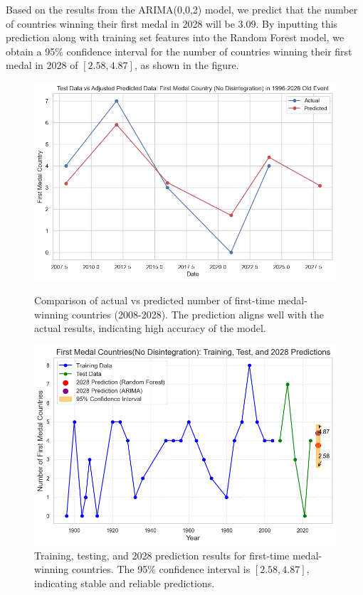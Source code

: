 \documentclass{mcmthesis}  %
\begin{document}
Based on the results from the ARIMA(0,0,2) model, we predict that the number of countries winning their first medal in 2028 will be 3.09. By inputting this prediction along with training set features into the Random Forest model, we obtain a 95\% confidence interval for the number of countries winning their first medal in 2028 of $[2.58, 4.87]$, as shown in the figure.

\begin{figure}[H]
  \centering
  \begin{minipage}[b]{0.42\textwidth}
    \includegraphics[width=\textwidth]{first_medal/9}
    \caption{Comparison of actual vs predicted number of first-time medal-winning countries (2008-2028). The prediction aligns well with the actual results, indicating high accuracy of the model.}
    \label{fig:image-a}
  \end{minipage}
  \hfill
  \begin{minipage}[b]{0.42\textwidth}
    \includegraphics[width=\textwidth]{first_medal/10}
    \caption{Training, testing, and 2028 prediction results for first-time medal-winning countries. The 95\% confidence interval is $[2.58, 4.87]$, indicating stable and reliable predictions.}
    \label{fig:image-a}
  \end{minipage}
  \label{fig:images}
\end{figure}
\end{document}
